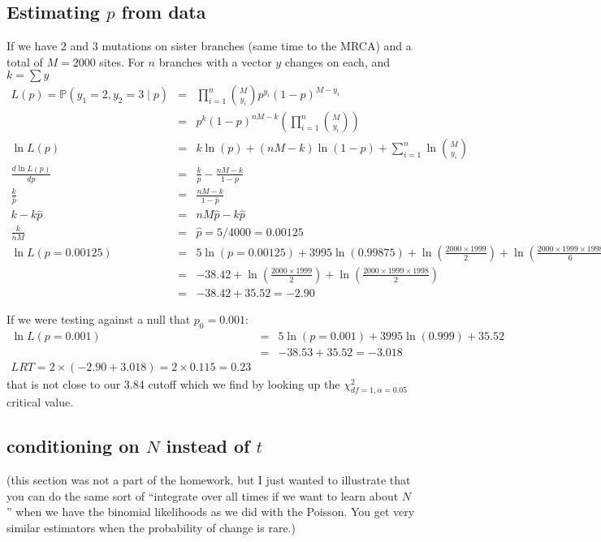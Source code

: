 \documentclass[11pt]{article}
\renewcommand{\Pr}{\mathbb{P}}
\begin{document}
\subsection*{Estimating $p$ from data}
If we have 2 and 3 mutations on sister branches (same time to the MRCA) and a total of 
$M=2000$ sites.
For $n$ branches with a vector $y$ changes on each, and $k= \sum y$
\begin{eqnarray*}
   L(p) =  \Pr(y_1=2, y_2=3 \mid p)
   & = & \prod_{i=1}^n {M \choose y_i} p^{y_i}(1-p)^{M-y_i} \\ 
   & = & p^{k}(1-p)^{nM-k} \left(\prod_{i=1}^n {M \choose y_i} \right)  \\ 
   \ln L(p) & = & k\ln(p) + (nM - k)\ln(1-p) + \sum_{i=1}^n \ln {M \choose y_i} \\
   \frac{d\ln L(p)}{dp} & = & \frac{k}{p} - \frac{nM - k}{1-p}\\
   \frac{k}{\hat{p}} & = & \frac{nM - k}{1-\hat{p}} \\
   k - k\hat{p} & = & nM\hat{p} - k\hat{p} \\
   \frac{k}{nM} & = & \hat{p} = 5/4000 = 0.00125 \\
   \ln L(p=0.00125) & = & 5\ln(p=0.00125) + 3995\ln(0.99875) + \ln\left({\frac{2000\times 1999}{2}}\right)+ \ln\left({\frac{2000\times 1999\times 1998}{6}}\right) \\
   & = & -38.42 + \ln\left({\frac{2000\times 1999}{2}}\right)+ \ln\left({\frac{2000\times 1999\times 1998}{2}}\right) \\
   & = & -38.42 + 35.52 = -2.90
\end{eqnarray*}

If we were testing against a null that $p_0= 0.001$:
\begin{eqnarray*}
\ln L(p=0.001) & = & 5\ln(p=0.001) + 3995\ln(0.999) + 35.52 \\
& = & -38.53 + 35.52 = - 3.018 \\
LRT = 2\times(-2.90 + 3.018) = 2\times0.115 = 0.23
\end{eqnarray*}
that is not close to our 3.84 cutoff which we find by looking up the $\chi^{2}_{df=1,\alpha=0.05}$
critical value.


\subsection*{conditioning on $N$ instead of $t$}
(this section was not a part of the homework, but I just wanted to illustrate that you can do the 
same sort of ``integrate over all times if we want to learn about $N$'' when we
have the binomial likelihoods as we did with the Poisson.
You get very similar estimators when the probability of change is rare.)
\end{document}
